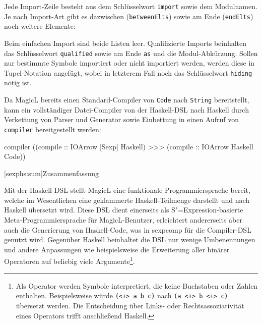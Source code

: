\documentclass[12pt, a4paper, bibgerm]{scrbook}
\newenvironment{DIFnomarkup}{}{}
\newcommand\icode[1]{\lstinline?#1?}
\newcommand\lsection{}
\newcommand\cref{}
\newcommand{\sexp}{S"=Expression}
\begin{document}
Jede Import-Zeile besteht aus dem Schlüsselwort \icode{import} sowie
dem Modulnamen. Je nach Import-Art gibt es dazwischen
(\icode{betweenElts}) sowie am Ende (\icode{endElts}) noch
weitere Elemente:
\begin{DIFnomarkup}\end{DIFnomarkup}%
Beim einfachen Import sind beide Listen leer. Qualifizierte Imports
beinhalten das Schlüsselwort \icode{qualified} sowie am Ende
\icode{as} und die Modul-Abkürzung. Sollen nur bestimmte Symbole
importiert oder nicht importiert werden, werden diese in
Tupel-Notation angefügt, wobei in letzterem Fall noch das
Schlüsselwort \icode{hiding} nötig ist.

Da MagicL bereits einen Standard-Compiler von \icode{Code} nach
\icode{String} bereitstellt, kann ein vollständiger Datei-Compiler von
der Haskell-DSL nach Haskell durch Verkettung von Parser
und Generator sowie Einbettung in einen Aufruf von \icode{compiler}
bereitgestellt werden:
\begin{DIFnomarkup}\begin{code}
compiler ((compile :: IOArrow [Sexp] Haskell) >>> 
          (compile :: IOArrow Haskell Code))  
\end{code}\end{DIFnomarkup}

\lsection[sexphs:sum]{Zusammenfassung}

Mit der Haskell-DSL stellt MagicL eine funktionale Programmiersprache
bereit, welche im Wesentlichen eine geklammerte Haskell-Teilmenge
darstellt und nach Haskell übersetzt wird. Diese DSL dient einerseits
als \sexp{}-basierte Meta-Programmiersprache für MagicL-Benutzer,
erleichtert andererseits aber auch die Generierung von Haskell-Code, was
in \cref{sexpcomp} für die Compiler-DSL genutzt wird. Gegenüber Haskell
beinhaltet die DSL nur wenige Umbenennungen und andere Anpassungen wie
beispielsweise die Erweiterung aller binärer Operatoren auf beliebig
viele Argumente\footnote{Als Operator werden Symbole interpretiert, die
  keine Buchstaben oder Zahlen enthalten. Beispielsweise würde
  \icode{(<+> a b c)} nach \icode{(a <+> b <+> c)} übersetzt werden. Die
  Entscheidung über Links- oder Rechtsassoziativität eines Operators
  trifft anschließend Haskell.}.
\end{document}
